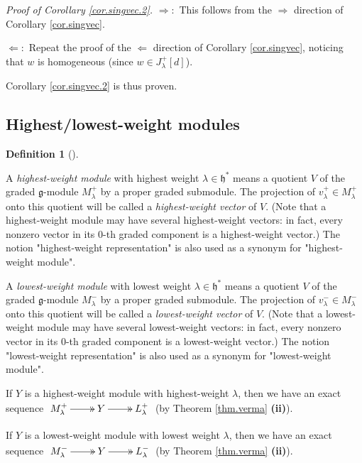 \documentclass
[numbers=enddot,12pt,final,onecolumn,german,notitlepage]{scrartcl}%
\makeatletter
\newcommand{\arsurj}{\ar@{->>}}
\theoremstyle{definition}
\newtheorem{defi}[theo]{Definition}
\newenvironment{definition}[1][]
{\begin{defi}[#1]\begin{leftbar}}
{\end{leftbar}\end{defi}}
\makeatother
\begin{document}
\textit{Proof of Corollary \ref{cor.singvec.2}.} $\Longrightarrow:$ This
follows from the $\Longrightarrow$ direction of Corollary \ref{cor.singvec}.

$\Longleftarrow:$ Repeat the proof of the $\Longleftarrow$ direction of
Corollary \ref{cor.singvec}, noticing that $w$ is homogeneous (since $w\in
J_{\lambda}^{+}\left[  d\right]  $).

Corollary \ref{cor.singvec.2} is thus proven.

\subsection{Highest/lowest-weight modules}

\begin{definition}
A \textit{highest-weight module} with highest weight $\lambda\in
\mathfrak{h}^{\ast}$ means a quotient $V$ of the graded $\mathfrak{g}$-module
$M_{\lambda}^{+}$ by a proper graded submodule. The projection of $v_{\lambda
}^{+}\in M_{\lambda}^{+}$ onto this quotient will be called a
\textit{highest-weight vector} of $V$. (Note that a highest-weight module may
have several highest-weight vectors: in fact, every nonzero vector in its
$0$-th graded component is a highest-weight vector.) The notion
"highest-weight representation" is also used as a synonym for "highest-weight module".

A \textit{lowest-weight module} with lowest weight $\lambda\in\mathfrak{h}%
^{\ast}$ means a quotient $V$ of the graded $\mathfrak{g}$-module $M_{\lambda
}^{-}$ by a proper graded submodule. The projection of $v_{\lambda}^{-}\in
M_{\lambda}^{-}$ onto this quotient will be called a \textit{lowest-weight
vector} of $V$. (Note that a lowest-weight module may have several
lowest-weight vectors: in fact, every nonzero vector in its $0$-th graded
component is a lowest-weight vector.) The notion "lowest-weight
representation" is also used as a synonym for "lowest-weight module".

If $Y$ is a highest-weight module with highest-weight $\lambda$, then we have
an exact sequence $%
\xymatrix{
M^{+}_{\lambda} \arsurj[r] & Y \arsurj[r] & L^{+}_{\lambda}
}%
$ (by Theorem \ref{thm.verma} \textbf{(ii)}).

If $Y$ is a lowest-weight module with lowest weight $\lambda$, then we have an
exact sequence $%
\xymatrix{
M^{-}_{\lambda} \arsurj[r] & Y \arsurj[r] & L^{-}_{\lambda}
}%
$ (by Theorem \ref{thm.verma} \textbf{(ii)}).
\end{definition}
\end{document}
